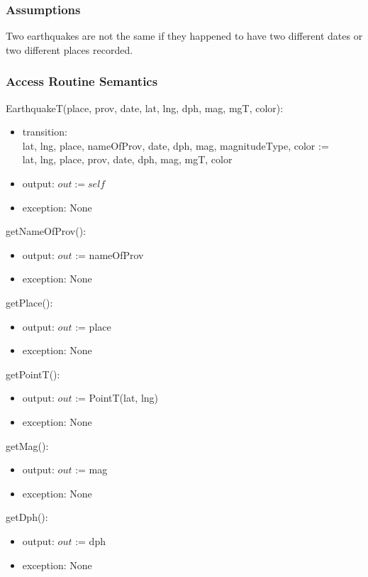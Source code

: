 \documentclass[12pt]{article}
\begin{document}
\subsubsection* {Assumptions}

Two earthquakes are not the same if they happened to have two different dates or two different places recorded.

\medskip

\subsubsection* {Access Routine Semantics}

EarthquakeT(place, prov, date, lat, lng, dph, mag, mgT, color):
\begin{itemize}
\item transition: \\ lat, lng, place, nameOfProv, date, dph, mag, magnitudeType, color :=\\
  lat, lng, place, prov, date, dph, mag, mgT, color
\item output: $\mathit{out} := \mathit{self}$
\item exception: None
\end{itemize}

\noindent getNameOfProv():
\begin{itemize}
\item output: $out$ := nameOfProv
\item exception: None
\end{itemize}

\noindent getPlace():
\begin{itemize}
\item output: $out$ := place
\item exception: None
\end{itemize}

\noindent getPointT():
\begin{itemize}
\item output: $out$ := PointT(lat, lng)
\item exception: None
\end{itemize}

\noindent getMag():
\begin{itemize}
\item output: $out$ := mag
\item exception: None
\end{itemize}

\noindent getDph():
\begin{itemize}
\item output: $out$ := dph
\item exception: None
\end{itemize}
\end{document}
